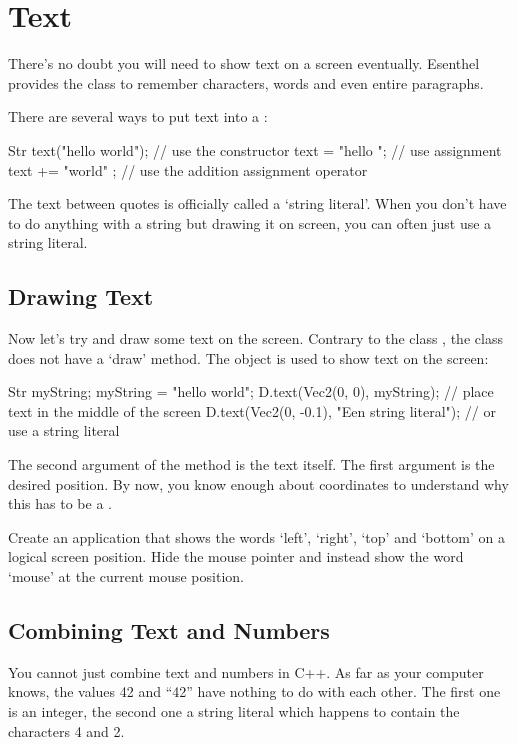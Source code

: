 \chapter{Text}

There's no doubt you will need to show text on a screen eventually. Esenthel provides the class  to remember characters, words and even entire paragraphs.

There are several ways to put text into a :

\begin{code}
Str text("hello world"); // use the constructor
text  = "hello "; // use assignment
text += "world" ; // use the addition assignment operator
\end{code}

\begin{note}
The text between quotes is officially called a `string literal'. When you don't have to do anything with a string but drawing it on screen, you can often just use a string literal.
\end{note}

\section{Drawing Text}
Now let's try and draw some text on the screen. Contrary to the class , the  class does not have a `draw' method. The object  is used to show text on the screen:

\begin{code}
Str myString;
myString = "hello world";
D.text(Vec2(0, 0), myString); // place text in the middle of the screen
D.text(Vec2(0, -0.1), "Een string literal"); // or use a string literal
\end{code}

The second argument of the method  is the text itself. The first argument is the desired position. By now, you know enough about coordinates to understand why this has to be a .

\begin{exercise}
Create an application that shows the words `left', `right', `top' and `bottom' on a logical screen position. Hide the mouse pointer and instead show the word `mouse' at the current mouse position.
\end{exercise}

\section{Combining Text and Numbers}
You cannot just combine text and numbers in C++. As far as your computer knows, the values 42 and ``42'' have nothing to do with each other. The first one is an integer, the second one a string literal which happens to contain the characters 4 and 2. 

